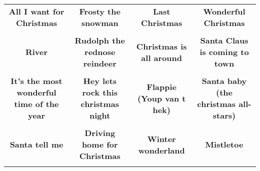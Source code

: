 \documentclass[12pt]{article} \usepackage{eso-pic, graphicx}
\newcommand{\background}[1]{%
\AddToShipoutPictureBG*{\texttt{[image: \#1]}}
}
\begin{document}
\tabcolsep=30.2pt \renewcommand{\arraystretch}{4.5}   \vspace*{4.3cm} \begin{center}  \begin{tabular}{c c c c}
\parbox{3cm}{\centering \textbf{All I want for Christmas}}& 
\parbox{3cm}{\centering \textbf{Frosty the snowman}}& 
\parbox{3cm}{\centering \textbf{Last Christmas}}& 
\parbox{3cm}{\centering \textbf{Wonderful Christmas}}\\ \\ 
\parbox{3cm}{\centering \textbf{River}}& 
\parbox{3cm}{\centering \textbf{Rudolph the rednose reindeer}}& 
\parbox{3cm}{\centering \textbf{Christmas is all around}}& 
\parbox{3cm}{\centering \textbf{Santa Claus is coming to town}}\\ \\ 
\parbox{3cm}{\centering \textbf{It’s the most wonderful time of the year}}& 
\parbox{3cm}{\centering \textbf{Hey lets rock this christmas night}}& 
\parbox{3cm}{\centering \textbf{Flappie (Youp van t hek)}}& 
\parbox{3cm}{\centering \textbf{Santa baby (the christmas all-stars)}}\\ \\ 
\parbox{3cm}{\centering \textbf{Santa tell me}}& 
\parbox{3cm}{\centering \textbf{Driving home for Christmas}}& 
\parbox{3cm}{\centering \textbf{Winter wonderland}}& 
\parbox{3cm}{\centering \textbf{Mistletoe}}\\ \\ 
\end{tabular} \background{discobingo.pdf} \end{center} 
\end{document}
